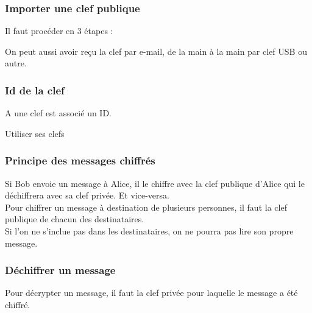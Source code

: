 \documentclass{beamer}
\begin{document}
\begin{frame}
\frametitle{Importer une clef publique}
Il faut procéder en 3 étapes :
\begin{itemize}
\end{itemize}
On peut aussi avoir reçu  la clef par e-mail, de la main à la main par clef USB ou autre.
\end{frame}

\begin{frame}
\frametitle{Id de la clef}
A une clef est associé un ID.
\end{frame}



\begin{frame}
\begin{center}
\Huge{Utiliser ses clefs }
\end{center}
\end{frame}

\begin{frame}
\frametitle{Principe des messages chiffrés}
Si Bob envoie un message à Alice, il le chiffre avec la clef publique d’Alice qui le déchiffrera avec sa clef privée. Et vice-versa.
\\
Pour chiffrer un message à destination de plusieurs personnes, il faut la clef publique de chacun des destinataires.
\\
Si l’on ne s’inclue pas dans les destinataires, on ne pourra pas lire son propre message.
\end{frame}

\begin{frame}
\frametitle{Déchiffrer un message}
Pour décrypter un message, il faut la clef privée pour laquelle le message a été chiffré.
\end{frame}
\end{document}
